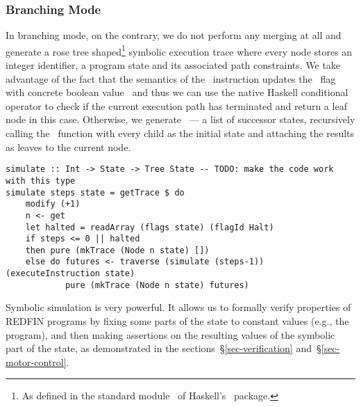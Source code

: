\subsubsection{Branching Mode}

In branching mode, on the contrary, we do not perform any merging at all and
generate a rose tree shaped\footnote{As defined in the standard
module~ of Haskell's~ package.} symbolic
execution trace where every node stores an integer identifier, a program state
and its associated path constraints. We take advantage of the fact that the
semantics of the~ instruction updates the~ flag with concrete
boolean value~ and thus we can use the native Haskell conditional
operator to check if the current execution path has terminated and return a leaf
node in this case. Otherwise, we generate~ --- a list of successor
states, recursively calling the~ function with every child as the
initial state and attaching the results as leaves to the current node.

\vspace{1mm}
\begin{verbatim}
simulate :: Int -> State -> Tree State -- TODO: make the code work with this type
simulate steps state = getTrace $ do
    modify (+1)
    n <- get
    let halted = readArray (flags state) (flagId Halt)
    if steps <= 0 || halted
    then pure (mkTrace (Node n state) [])
    else do futures <- traverse (simulate (steps-1)) (executeInstruction state)
            pure (mkTrace (Node n state) futures)
\end{verbatim}
\vspace{1mm}

\noindent
Symbolic simulation is very powerful. It allows us to formally verify properties
of REDFIN programs by fixing some parts of the state to constant values (e.g.,
the program), and then making assertions on the resulting values of
the symbolic part of the state, as demonstrated in the
sections~\S\ref{sec-verification} and~\S\ref{sec-motor-control}.
